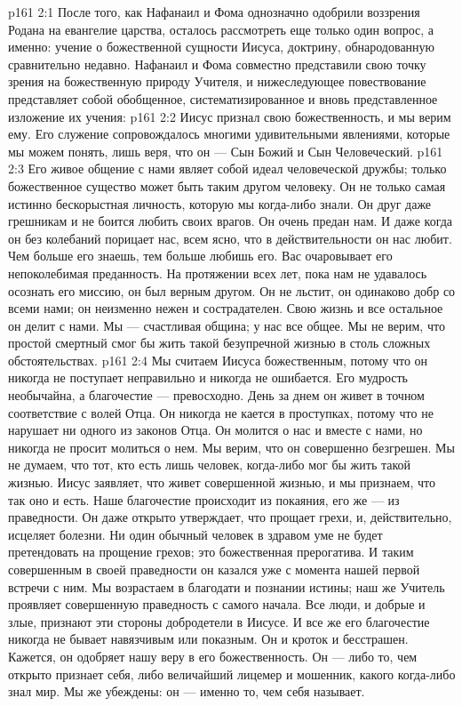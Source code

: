 \vs p161 2:1 После того, как Нафанаил и Фома однозначно одобрили воззрения Родана на евангелие царства, осталось рассмотреть еще только один вопрос, а именно: учение о божественной сущности Иисуса, доктрину, обнародованную сравнительно недавно. Нафанаил и Фома совместно представили свою точку зрения на божественную природу Учителя, и нижеследующее повествование представляет собой обобщенное, систематизированное и вновь представленное изложение их учения:
\vs p161 2:2 \bibnobreakspace Иисус признал свою божественность, и мы верим ему. Его служение сопровождалось многими удивительными явлениями, которые мы можем понять, лишь веря, что он --- Сын Божий и Сын Человеческий.
\vs p161 2:3 \pc {}\bibnobreakspace Его живое общение с нами являет собой идеал человеческой дружбы; только божественное существо может быть таким другом человеку. Он не только самая истинно бескорыстная личность, которую мы когда\hyp{}либо знали. Он друг даже грешникам и не боится любить своих врагов. Он очень предан нам. И даже когда он без колебаний порицает нас, всем ясно, что в действительности он нас любит. Чем больше его знаешь, тем больше любишь его. Вас очаровывает его непоколебимая преданность. На протяжении всех лет, пока нам не удавалось осознать его миссию, он был верным другом. Он не льстит, он одинаково добр со всеми нами; он неизменно нежен и сострадателен. Свою жизнь и все остальное он делит с нами. Мы --- счастливая община; у нас все общее. Мы не верим, что простой смертный смог бы жить такой безупречной жизнью в столь сложных обстоятельствах.
\vs p161 2:4 \pc {}\bibnobreakspace Мы считаем Иисуса божественным, потому что он никогда не поступает неправильно и никогда не ошибается. Его мудрость необычайна, а благочестие --- превосходно. День за днем он живет в точном соответствие с волей Отца. Он никогда не кается в проступках, потому что не нарушает ни одного из законов Отца. Он молится о нас и вместе с нами, но никогда не просит молиться о нем. Мы верим, что он совершенно безгрешен. Мы не думаем, что тот, кто есть лишь человек, когда\hyp{}либо мог бы жить такой жизнью. Иисус заявляет, что живет совершенной жизнью, и мы признаем, что так оно и есть. Наше благочестие происходит из покаяния, его же --- из праведности. Он даже открыто утверждает, что прощает грехи, и, действительно, исцеляет болезни. Ни один обычный человек в здравом уме не будет претендовать на прощение грехов; это божественная прерогатива. И таким совершенным в своей праведности он казался уже с момента нашей первой встречи с ним. Мы возрастаем в благодати и познании истины; наш же Учитель проявляет совершенную праведность с самого начала. Все люди, и добрые и злые, признают эти стороны добродетели в Иисусе. И все же его благочестие никогда не бывает навязчивым или показным. Он и кроток и бесстрашен. Кажется, он одобряет нашу веру в его божественность. Он --- либо то, чем открыто признает себя, либо величайший лицемер и мошенник, какого когда\hyp{}либо знал мир. Мы же убеждены: он --- именно то, чем себя называет.
